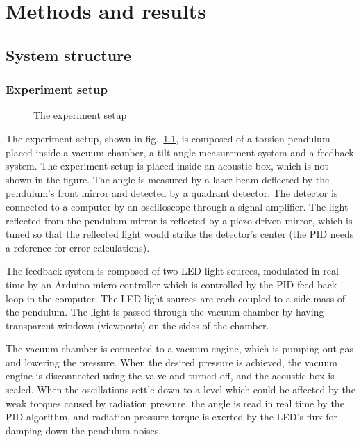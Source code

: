 \documentclass[\main/master.tex]{subfiles}
\begin{document}
\newspacing
\chapter{Methods and results}\label{chapter:Methods and results}

\section{System structure}
\subsection{Experiment setup}
\begin{figure}[htbp]
	\centering
	\caption[The experiment setup]{The experiment setup}
	\label{fig:setup}
\end{figure}
\FloatBarrier
\par\noindent
The experiment setup, shown in fig.~\ref{fig:setup}, is composed of a torsion pendulum placed inside a vacuum chamber, a tilt angle measurement system and a feedback system. The experiment setup is placed inside an acoustic box, which is not shown in the figure. The angle is measured by a laser beam deflected by the pendulum's front mirror and detected by a quadrant detector. The detector is connected to a computer by an oscilloscope through a signal amplifier. The light reflected from the pendulum mirror is reflected by a piezo driven mirror, which is tuned so that the reflected light would strike the detector's center (the PID needs a reference for error calculations). 
\par\noindent
The feedback system is composed of two LED light sources, modulated in real time by an Arduino micro-controller which is controlled by the PID feed-back loop in the computer. The LED light sources are each coupled to a side mass of the pendulum. The light is passed through the vacuum chamber by having transparent windows (viewports) on the sides of the chamber. 
\par\noindent
The vacuum chamber is connected to a vacuum engine, which is pumping out gas and lowering the pressure. When the desired pressure is achieved, the vacuum engine is disconnected using the valve and turned off, and the acoustic box is sealed. When the oscillations settle down to a level which could be affected by the weak torques caused by radiation pressure, the angle is read in real time by the PID algorithm, and radiation-pressure torque is exerted by the LED's flux for damping down the pendulum noises.
\end{document}
